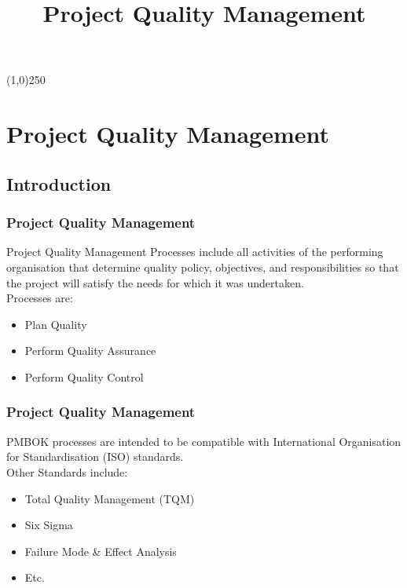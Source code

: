 




\title[Project Management \& BIM]{Project Quality Management}



%
\usetikzlibrary{arrows}

\tableofcontents
\newpage



\begin{frame}
\titlepage
\end{frame}\begin{center}\line(1,0){250}\end{center}
%
%








\section{Project Quality Management}

\subsection{Introduction}

\begin{frame}
\frametitle{Project Quality Management}
Project Quality Management Processes include all activities of the performing organisation that determine quality policy, objectives, and responsibilities so that the project will satisfy the needs for which it was undertaken.\\
Processes are:\\
\begin{itemize}
	\item Plan Quality
	\item Perform Quality Assurance
	\item Perform Quality Control
\end{itemize}
\end{frame}




\begin{frame}
\frametitle{Project Quality Management}
PMBOK processes are intended to be compatible with International Organisation for Standardisation (ISO) standards.\\
Other Standards include:\\
\begin{itemize}
	\item Total Quality Management (TQM)
	\item Six Sigma
	\item Failure Mode \& Effect Analysis
	\item Etc.
\end{itemize}
\end{frame}





